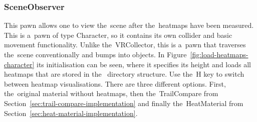 \pagebreak{}

\subsubsection*{SceneObserver}

This pawn allows one to view the~scene after the~heatmaps have been measured. This is a~pawn of type Character, so it contains its own collider and basic movement functionality. Unlike the~VRCollector, this is a~pawn that traverses the~scene conventionally and bumps into objects. In Figure~\ref{fig:load-heatmaps-character} its initialisation can be seen, where it specifies its height and loads all heatmaps that are stored in the~ directory structure. Use the~H key to switch between heatmap visualisations. There are three different options. First, the~original material without heatmaps, then the~TrailCompare from Section~\ref{sec:trail-compare-implementation} and finally the~HeatMaterial from Section~\ref{sec:heat-material-implementation}.

